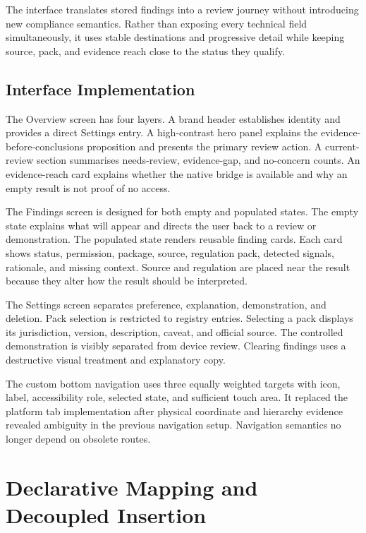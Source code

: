 The interface translates stored findings into a review journey without introducing new compliance semantics. Rather than exposing every technical field simultaneously, it uses stable destinations and progressive detail while keeping source, pack, and evidence reach close to the status they qualify.

\subsection{Interface Implementation}

The Overview screen has four layers. A brand header establishes identity and provides a direct Settings entry. A high-contrast hero panel explains the evidence-before-conclusions proposition and presents the primary review action. A current-review section summarises needs-review, evidence-gap, and no-concern counts. An evidence-reach card explains whether the native bridge is available and why an empty result is not proof of no access.

The Findings screen is designed for both empty and populated states. The empty state explains what will appear and directs the user back to a review or demonstration. The populated state renders reusable finding cards. Each card shows status, permission, package, source, regulation pack, detected signals, rationale, and missing context. Source and regulation are placed near the result because they alter how the result should be interpreted.

The Settings screen separates preference, explanation, demonstration, and deletion. Pack selection is restricted to registry entries. Selecting a pack displays its jurisdiction, version, description, caveat, and official source. The controlled demonstration is visibly separated from device review. Clearing findings uses a destructive visual treatment and explanatory copy.

The custom bottom navigation uses three equally weighted targets with icon, label, accessibility role, selected state, and sufficient touch area. It replaced the platform tab implementation after physical coordinate and hierarchy evidence revealed ambiguity in the previous navigation setup. Navigation semantics no longer depend on obsolete routes.


\section{Declarative Mapping and Decoupled Insertion}

